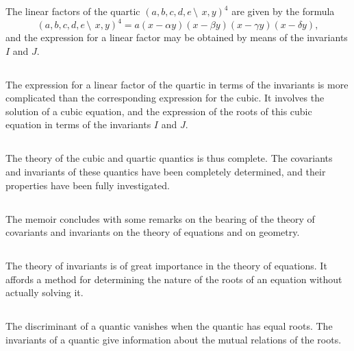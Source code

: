 \documentclass[11pt,a4paper]{book}
\begin{document}
\begin{center}
The linear factors of the quartic $(a, b, c, d, e\,\setminus\!\!\:\, x, y)^4$ are given by the formula
\[
(a, b, c, d, e\,\setminus\!\!\:\, x, y)^4 = a(x - \alpha y)(x - \beta y)(x - \gamma y)(x - \delta y),
\]
and the expression for a linear factor may be obtained by means of the invariants $I$ and $J$.

\subsection{}

The expression for a linear factor of the quartic in terms of the invariants is more complicated than the corresponding expression for the cubic. It involves the solution of a cubic equation, and the expression of the roots of this cubic equation in terms of the invariants $I$ and $J$.

\subsection{}

The theory of the cubic and quartic quantics is thus complete. The covariants and invariants of these quantics have been completely determined, and their properties have been fully investigated.

\subsection{}

The memoir concludes with some remarks on the bearing of the theory of covariants and invariants on the theory of equations and on geometry.

\subsection{}

The theory of invariants is of great importance in the theory of equations. It affords a method for determining the nature of the roots of an equation without actually solving it.

\subsection{}

The discriminant of a quantic vanishes when the quantic has equal roots. The invariants of a quantic give information about the mutual relations of the roots.

\subsection{}


\end{center}
\end{document}
